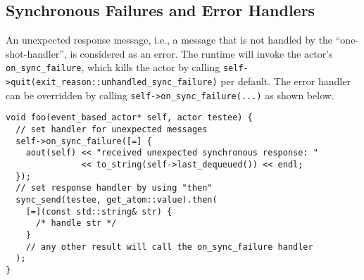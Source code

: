 \clearpage
\subsection{Synchronous Failures and Error Handlers}

An unexpected response message, i.e., a message that is not handled by the ``one-shot-handler'', is considered as an error. The runtime will invoke the actor's \lstinline^on_sync_failure^, which kills the actor by calling \lstinline^self->quit(exit_reason::unhandled_sync_failure)^ per default. The error handler can be overridden by calling \lstinline^self->on_sync_failure(...)^ as shown below.

\begin{lstlisting}
void foo(event_based_actor* self, actor testee) {
  // set handler for unexpected messages
  self->on_sync_failure([=] {
    aout(self) << "received unexpected synchronous response: "
               << to_string(self->last_dequeued()) << endl;
  });
  // set response handler by using "then"
  sync_send(testee, get_atom::value).then(
    [=](const std::string& str) {
      /* handle str */
    }
    // any other result will call the on_sync_failure handler
  );
}
\end{lstlisting}
